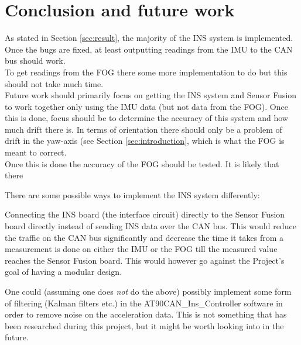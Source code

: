 
\section{Conclusion and future work}\label{sec:conclusion}
As stated in Section \ref{sec:result}, the majority of the INS system is implemented. Once the bugs are fixed, at least outputting readings from the IMU to the CAN bus should work. \\
To get readings from the FOG there some more implementation to do but this should not take much time. \\ %
Future work should primarily focus on getting the INS system and Sensor Fusion to work together only using the IMU data (but not data from the FOG). Once this is done, focus should be to determine the accuracy of this system and how much drift there is. In terms of orientation there should only be a problem of drift in the yaw-axis (see Section \ref{sec:introduction}, which is what the FOG is meant to correct. \\
Once this is done the accuracy of the FOG should be tested. It is likely that there 

There are some possible ways to implement the INS system differently:

Connecting the INS board (the interface circuit) directly to the Sensor Fusion board directly instead of sending INS data over the CAN bus. This would reduce the traffic on the CAN bus significantly and decrease the time it takes from a measurement is done on either the IMU or the FOG till the measured value reaches the Sensor Fusion board. This would however go against the Project's goal of having a modular design.

One could (assuming one does \emph{not} do the above) possibly implement some form of filtering (Kalman filters etc.) in the AT90CAN\_Ins\_Controller software in order to remove noise on the acceleration data. This is not something that has been researched during this project, but it might be worth looking into in the future.